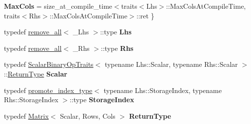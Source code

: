 \begin{DoxyCompactItemize}
{\bfseries Max\+Cols} = size\+\_\+at\+\_\+compile\+\_\+time$<$traits$<$Lhs$>$\+:\+:Max\+Cols\+At\+Compile\+Time, traits$<$Rhs$>$\+:\+:Max\+Cols\+At\+Compile\+Time$>$\+:\+:ret
 \}
\item 
\mbox{\label{struct_eigen_1_1internal_1_1traits_3_01_kronecker_product_3_01___lhs_00_01___rhs_01_4_01_4_aa1a40be37fbd572f76a613004791da60}} 
typedef \hyperlink{struct_eigen_1_1internal_1_1remove__all}{remove\+\_\+all}$<$ \+\_\+\+Lhs $>$\+::type {\bfseries Lhs}
\item 
\mbox{\label{struct_eigen_1_1internal_1_1traits_3_01_kronecker_product_3_01___lhs_00_01___rhs_01_4_01_4_a8aafe51a47232ee8ec2b004bdd59d3ae}} 
typedef \hyperlink{struct_eigen_1_1internal_1_1remove__all}{remove\+\_\+all}$<$ \+\_\+\+Rhs $>$\+::type {\bfseries Rhs}
\item 
\mbox{\label{struct_eigen_1_1internal_1_1traits_3_01_kronecker_product_3_01___lhs_00_01___rhs_01_4_01_4_a2927f991e1f07a8e120bf5b45bd5bf23}} 
typedef \hyperlink{group___core___module_struct_eigen_1_1_scalar_binary_op_traits}{Scalar\+Binary\+Op\+Traits}$<$ typename Lhs\+::\+Scalar, typename Rhs\+::\+Scalar $>$\+::\hyperlink{group___core___module_class_eigen_1_1_matrix}{Return\+Type} {\bfseries Scalar}
\item 
\mbox{\label{struct_eigen_1_1internal_1_1traits_3_01_kronecker_product_3_01___lhs_00_01___rhs_01_4_01_4_a7af240d5b7fcb783b3ac9e76f9055a70}} 
typedef \hyperlink{struct_eigen_1_1internal_1_1promote__index__type}{promote\+\_\+index\+\_\+type}$<$ typename Lhs\+::\+Storage\+Index, typename Rhs\+::\+Storage\+Index $>$\+::type {\bfseries Storage\+Index}
\item 
\mbox{\label{struct_eigen_1_1internal_1_1traits_3_01_kronecker_product_3_01___lhs_00_01___rhs_01_4_01_4_a7b14187ef42535a8982def992f924785}} 
typedef \hyperlink{group___core___module_class_eigen_1_1_matrix}{Matrix}$<$ Scalar, Rows, Cols $>$ {\bfseries Return\+Type}

\end{DoxyCompactItemize}
